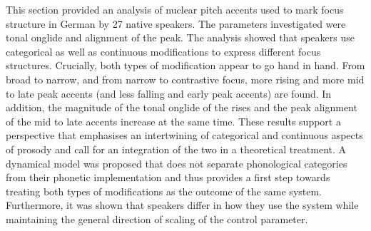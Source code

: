 This section provided an analysis of nuclear pitch accents used to mark focus structure in German by 27 native speakers. The parameters investigated were tonal onglide and alignment of the peak. The analysis showed that speakers use categorical as well as continuous modifications to express different focus structures. Crucially, both types of modification appear to go hand in hand. From broad to narrow, and from narrow to contrastive focus, more rising and more mid to late peak accents (and less falling and early peak accents) are found. In addition, the magnitude of the tonal onglide of the rises and the peak alignment of the mid to late accents increase at the same time. These results support a perspective that emphasises an intertwining of categorical and continuous aspects of prosody and call for an integration of the two in a theoretical treatment. A dynamical model was proposed that does not separate phonological categories from their phonetic implementation and thus provides a first step towards treating both types of modifications as the outcome of the same system. Furthermore, it was shown that speakers differ in how they use the system while maintaining the general direction of scaling of the control parameter.

